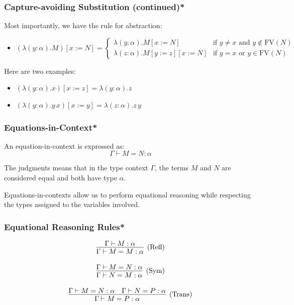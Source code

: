 \documentclass[aspectratio=169]{beamer}
\begin{document}
\begin{frame}
\frametitle{Capture-avoiding Substitution (continued)*}

Most importantly, we have the rule for abstraction:

\begin{itemize}
    \item $(\lambda (y : \alpha). M)[x := N] =
    \begin{cases}
    \lambda (y : \alpha). M[x := N] & \text{if } y \neq x \text{ and } y \notin \text{FV}(N) \\
    \lambda (z : \alpha). M[y := z][x := N] & \text{if } y = x \text{ or } y \in \text{FV}(N)
    \end{cases}$
\end{itemize}
\pause
Here are two examples:
\begin{itemize}
    \item $(\lambda (y : \alpha). x)[x := z] = \lambda (y : \alpha). z$
    \item $(\lambda (y : \alpha). y \, x)[x := y] = \lambda (z : \alpha). z \, y$
\end{itemize}

\end{frame}

\begin{frame}
\frametitle{Equations-in-Context*}

An equation-in-context is expressed as:
\[
\Gamma \vdash M = N : \alpha
\]

The judgments means that in the type context $\Gamma$, the terms $M$ and $N$ are considered equal and both have type $\alpha$.

\medskip

Equations-in-contexts allow us to perform equational reasoning while respecting the types assigned to the variables involved.

\end{frame}

\begin{frame}
\frametitle{Equational Reasoning Rules*}

\[
\infer[\text{(Refl)}]{\Gamma \vdash M = M : \alpha}{\Gamma \vdash M : \alpha}
\]

\[
\infer[\text{(Sym)}]{\Gamma \vdash N = M : \alpha}{\Gamma \vdash M = N : \alpha}
\]

\[
\infer[\text{(Trans)}]{\Gamma \vdash M = P : \alpha}{\Gamma \vdash M = N : \alpha & \Gamma \vdash N = P : \alpha}
\]
\end{frame}
\end{document}
